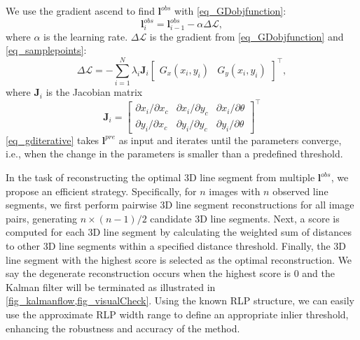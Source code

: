 We use the gradient ascend to find $\mathbf{l}^{obs}$ with \cref{eq_GDobjfunction}:
\begin{equation}
\mathbf{l}^{obs}_{i}=\mathbf{l}^{obs}_{i-1}-\alpha \Delta \mathcal{L},
\label{eq_gditerative}
\end{equation}
where \( \alpha \) is the learning rate.
\( \Delta \mathcal{L} \) is the gradient from \cref{eq_GDobjfunction} and \cref{eq_samplepoints}:
\begin{equation}
\Delta \mathcal{L} = - \sum_{i=1}^{N} \lambda_i \mathbf{J}_i
\begin{bmatrix}
G_x(x_i, y_i) &
G_y(x_i, y_i)
\end{bmatrix}^{\top},
\end{equation}
where $\mathbf{J}_i$ is the Jacobian matrix
\begin{equation}
\mathbf{J}_i=
\begin{bmatrix}
\partial x_i / \partial x_c & \partial x_i / \partial y_c & \partial x_i / \partial \theta \\
\partial y_i / \partial x_c & \partial y_i / \partial y_c & \partial y_i / \partial \theta
\end{bmatrix}^{\top}
\end{equation}
\cref{eq_gditerative} takes $\mathbf{l}^{pre}$ as input and iterates until the parameters converge, i.e., when the change in the parameters is smaller than a predefined threshold.

In the task of reconstructing the optimal 3D line segment from multiple $\mathbf l^{obs}$, we propose an efficient strategy. 
Specifically, 
for \( n \) images with \( n \) observed line segments, 
we first perform pairwise 3D line segment reconstructions for all image pairs, 
generating \( n \times (n-1) / 2 \) candidate 3D line segments. 
Next, a score is computed for each 3D line segment by calculating the weighted sum of distances to other 3D line segments within a specified distance threshold. 
Finally, the 3D line segment with the highest score is selected as the optimal reconstruction.
We say the degenerate reconstruction occurs when the highest score is 0 and the Kalman filter will be terminated as illustrated in  \cref{fig_kalmanflow,fig_visualCheck}. 
Using the known RLP structure, 
we can easily use the approximate RLP width range to define an appropriate inlier threshold,
enhancing the robustness and accuracy of the method.


    








